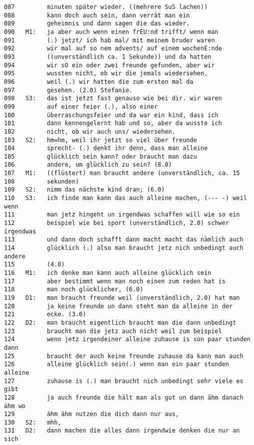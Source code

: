 \begin{lstlisting}[language={}]
087         minuten später wieder. ((mehrere SuS lachen))
088         kann doch auch sein, dann verrät man ein 
089         geheimnis und dann sagen die das wieder.
090   M1:   ja aber auch wenn einen frEU:nd trifft/ wenn man
091         (.) jetzt/ ich hab mal/ mit meinem bruder waren 
092         wir mal auf so nem advents/ auf einem wochenE:nde
093         ((unverständlich ca. 1 Sekunde)) und da hatten
094         wir sO ein oder zwei freunde gefunden, aber wir 
095         wussten nicht, ob wir die jemals wiedersehen, 
096         weil (.) wir hatten die zum ersten mal da 
097         gesehen. (2.0) Stefanie.
098   S3:   das ist jetzt fast genauso wie bei dir. wir waren 
099         auf einer feier (.), also einer 
100         überraschungsfeier und da war ein kind, dass ich 
101         dann kennengelernt hab und so, aber da wusste ich 
102         nicht, ob wir auch uns/ wiedersehen. 
103   S2:   hm=hm, weil ihr jetzt so viel über freunde 
104         sprecht- (.) denkt ihr denn, dass man alleine
105         glücklich sein kann? oder braucht man dazu 
106         andere, um glücklich zu sein? (8.0)
107   M1:   ((flüstert) man braucht andere (unverständlich, ca. 15 
108         sekunden)
109   S2:   nimm das nächste kind dran; (6.0)
110   S3:   ich finde man kann das auch alleine machen, (--- -) weil wenn 
111         man jetz hingeht un irgendwas schaffen will wie so ein 
112         beispiel wie bei sport (unverständlich, 2.0) schwer irgendwas 
113         und dann doch schafft dann macht macht das nämlich auch 
114         glücklich (.) also man braucht jetz nich unbedingt auch andere 
115         (4.0)
116   M1:   ich denke man kann auch alleine glücklich sein              
117         aber bestimmt wenn man noch einen zum reden hat is
118         man noch glücklicher, (6.0)
119   D1:   man braucht freunde weil (unverständlich, 2.0) hat man      
120         ja keine freunde un dann steht man da alleine in der
121         ecke. (3.0)
122   D2:   man braucht eigentlich braucht man die dann unbedingt 
123         braucht man die jetz auch nicht weil zum beispiel
124         wenn jetz irgendeiner alleine zuhause is son paar stunden dann 
125         braucht der auch keine freunde zuhause da kann man auch 
126         alleine glücklich sein(.) wenn man ein paar stunden alleine 
127         zuhause is (.) man braucht nich unbedingt sehr viele es gibt 
128         ja auch freunde die hält man als gut un dann ähm danach ähm wo 
129         ähm ähm nutzen die dich dann nur aus,
130   S2:   mhh,
131   D2:   dann machen die alles dann irgendwie denken die nur an sich 

\end{lstlisting}
